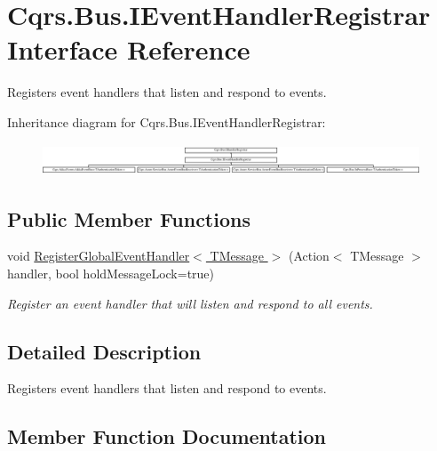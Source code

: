 \hypertarget{interfaceCqrs_1_1Bus_1_1IEventHandlerRegistrar}{}\section{Cqrs.\+Bus.\+I\+Event\+Handler\+Registrar Interface Reference}
\label{interfaceCqrs_1_1Bus_1_1IEventHandlerRegistrar}


Registers event handlers that listen and respond to events.  


Inheritance diagram for Cqrs.\+Bus.\+I\+Event\+Handler\+Registrar\+:\begin{figure}[H]
\begin{center}
\leavevmode
\includegraphics[height=0.954545cm]{interfaceCqrs_1_1Bus_1_1IEventHandlerRegistrar}
\end{center}
\end{figure}
\subsection*{Public Member Functions}
\begin{DoxyCompactItemize}
\item 
void \hyperlink{interfaceCqrs_1_1Bus_1_1IEventHandlerRegistrar_a80854abefd17bc58bd94e45266cf141e_a80854abefd17bc58bd94e45266cf141e}{Register\+Global\+Event\+Handler$<$ T\+Message $>$} (Action$<$ T\+Message $>$ handler, bool hold\+Message\+Lock=true)
\begin{DoxyCompactList}\small\item\em Register an event handler that will listen and respond to all events. \end{DoxyCompactList}\end{DoxyCompactItemize}


\subsection{Detailed Description}
Registers event handlers that listen and respond to events. 



\subsection{Member Function Documentation}
\mbox{\label{interfaceCqrs_1_1Bus_1_1IEventHandlerRegistrar_a80854abefd17bc58bd94e45266cf141e_a80854abefd17bc58bd94e45266cf141e}} 
